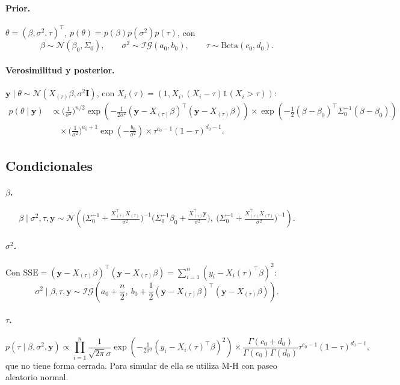 \documentclass[11pt]{article}
\newcommand{\N}{\mathcal{N}}
\newcommand{\IG}{\mathcal{IG}}
\newcommand{\ind}{\mathbb{1}}
\newcommand{\by}{\mathbf{y}}
\newcommand{\bI}{\mathbf{I}}
\theoremstyle{definition}
\begin{document}
\paragraph{Prior.} $\theta=(\beta,\sigma^2,\tau)^{\top}$, $p(\theta)=p(\beta)p(\sigma^2)p(\tau)$, con
\[
\beta\sim\N(\beta_0,\Sigma_0),\qquad\sigma^2\sim\IG(a_0,b_0),\qquad\tau\sim\text{Beta}(c_0,d_0).
\]

\paragraph{Verosimilitud y posterior.} $\by\mid\theta\sim\N(X_{(\tau)}\beta,\sigma^2\bI)$, con $X_i(\tau)=(1,X_i,(X_i-\tau)\ind(X_i>\tau))$:
\begin{align*}
p(\theta\mid\by)&\propto\Big(\tfrac{1}{\sigma^2}\Big)^{n/2}\exp\!\left(-\tfrac{1}{2\sigma^2}(\by-X_{(\tau)}\beta)^{\top}(\by-X_{(\tau)}\beta)\right)\times\exp\!\left(-\tfrac12(\beta-\beta_0)^{\top}\Sigma_0^{-1}(\beta-\beta_0)\right)\\
&\quad\times\Big(\tfrac{1}{\sigma^2}\Big)^{a_0+1}\exp\!\left(-\tfrac{b_0}{\sigma^2}\right)\times\tau^{c_0-1}(1-\tau)^{d_0-1}.
\end{align*}

\subsection{Condicionales}
\paragraph{$\beta$.}
\[
\beta\mid\sigma^2,\tau,\by\sim\N\!\left(\Big(\Sigma_0^{-1}+\tfrac{X_{(\tau)}^{\top}X_{(\tau)}}{\sigma^2}\Big)^{-1}\Big(\Sigma_0^{-1}\beta_0+\tfrac{X_{(\tau)}^{\top}\by}{\sigma^2}\Big),\ \Big(\Sigma_0^{-1}+\tfrac{X_{(\tau)}^{\top}X_{(\tau)}}{\sigma^2}\Big)^{-1}\right).
\]

\paragraph{$\sigma^2$.} Con $\text{SSE}=(\by-X_{(\tau)}\beta)^{\top}(\by-X_{(\tau)}\beta)=\sum_{i=1}^n(y_i-X_i(\tau)^{\top}\beta)^2$:
\[
\sigma^2\mid\beta,\tau,\by\sim\IG\!\left(a_0+\frac{n}{2},\ b_0+\frac{1}{2}(\by-X_{(\tau)}\beta)^{\top}(\by-X_{(\tau)}\beta)\right).
\]

\paragraph{$\tau$.}
\[
p(\tau\mid\beta,\sigma^2,\by)\propto\prod_{i=1}^n\frac{1}{\sqrt{2\pi}\sigma}\exp\!\left(-\tfrac{1}{2\sigma^2}(y_i-X_i(\tau)^{\top}\beta)^2\right)\times\frac{\Gamma(c_0+d_0)}{\Gamma(c_0)\Gamma(d_0)}\tau^{c_0-1}(1-\tau)^{d_0-1},
\]
que no tiene forma cerrada. Para simular de ella se utiliza M-H con paseo aleatorio normal.
\end{document}

